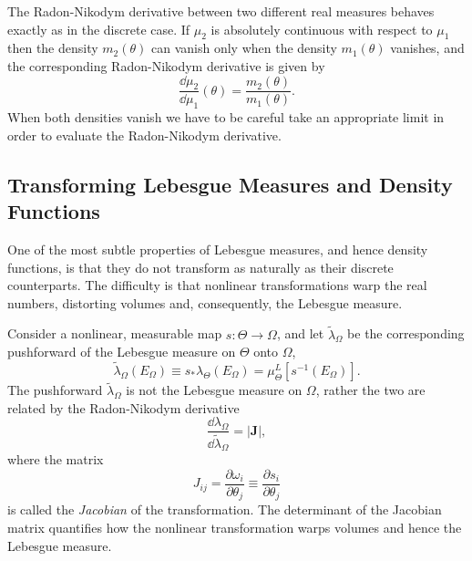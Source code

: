 The Radon-Nikodym derivative between two different real measures
behaves exactly as in the discrete case.  If $\mu_{2}$ is
absolutely continuous with respect to $\mu_{1}$ then the density
$m_{2} \! \left( \theta \right)$ can vanish only when the density
$m_{1} \! \left( \theta \right)$ vanishes, and the corresponding 
Radon-Nikodym derivative is given by
%
\begin{equation*}
\frac{ \dd \mu_{2} }{ \dd \mu_{1} } \! \left( \theta \right)
=
\frac{ m_{2} \! \left( \theta \right) }{ m_{1} \! \left( \theta \right) }.
\end{equation*}
%
When both densities vanish we have to be careful take an
appropriate limit in order to evaluate the Radon-Nikodym derivative.

\subsection{Transforming Lebesgue Measures and Density Functions}

One of the most subtle properties of Lebesgue measures, and
hence density functions, is that they do not transform as naturally
as their discrete counterparts.  The difficulty is that nonlinear
transformations warp the real numbers, distorting volumes and,
consequently, the Lebesgue measure.  

Consider a nonlinear, measurable map $s : \Theta \rightarrow \Omega$,
and let $\tilde{\lambda}_{\Omega}$ be the corresponding pushforward 
of the Lebesgue measure on $\Theta$ onto $\Omega$,
%
\begin{equation*}
\tilde{\lambda}_{\Omega} \! \left( E_{\Omega} \right)
\equiv
s_{*} \lambda_{\Theta} \! \left( E_{\Omega} \right)
=
\mu^{L}_{\Theta} \! \left[ s^{-1} \! \left( E_{\Omega} \right) \right].
\end{equation*}
%
The pushforward $\tilde{\lambda}_{\Omega}$ is not the Lebesgue 
measure on $\Omega$, rather the two are related by the Radon-Nikodym
derivative
%
\begin{equation*}
\frac{ \dd \lambda_{\Omega} }
{\dd \tilde{\lambda}_{\Omega} }
=
\left| \mathbf{J} \right|,
\end{equation*}
%
where the matrix
%
\begin{equation*}
J_{ij} 
= 
\frac{\partial \omega_{i} }{ \partial \theta_{j} }
\equiv 
\frac{ \partial s_{i} }{ \partial \theta_{j} }
\end{equation*} 
%
is called the \emph{Jacobian} of the transformation.  The determinant
of the Jacobian matrix quantifies how the nonlinear transformation 
warps volumes and hence the Lebesgue measure.

